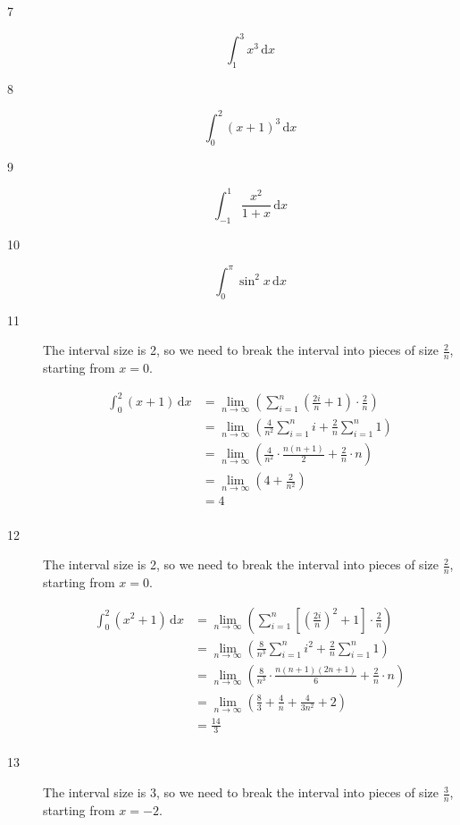 \documentclass{exam}
\begin{document}
\begin{description}
\item[7]
\[
  \int_1^3 x^3 \, \mathrm{d}x
\]

\item[8]
\[
  \int_0^2 (x+1)^3 \, \mathrm{d}x
\]

\item[9]
\[
  \int_{-1}^1 \frac{x^2}{1+x} \, \mathrm{d}x
\]

\item[10]
\[
  \int_0^\pi \sin^2 x \, \mathrm{d}x
\]

\item[11]
The interval size is 2, so we need to break the interval into pieces of size $\frac{2}{n}$, starting from $x = 0$.

\begin{align*}
  \int_0^2 (x+1) \, \mathrm{d}x &= \lim_{n \to \infty} \left( \sum_{i = 1}^n \left( \frac{2i}{n} + 1 \right) \cdot \frac{2}{n} \right) \\
  &= \lim_{n \to \infty} \left( \frac{4}{n^2} \sum_{i = 1}^n i + \frac{2}{n} \sum_{i = 1}^n 1 \right) \\
  &= \lim_{n \to \infty} \left( \frac{4}{n^2} \cdot \frac{n(n+1)}{2} + \frac{2}{n} \cdot n \right) \\
  &= \lim_{n \to \infty} \left( 4 + \frac{2}{n^2} \right) \\
  &= 4 \\
\end{align*}

\item[12]
The interval size is 2, so we need to break the interval into pieces of size $\frac{2}{n}$, starting from $x = 0$.

\begin{align*}
  \int_0^2 (x^2+1) \, \mathrm{d}x &= \lim_{n \to \infty} \left( \sum_{i = 1}^n \left[ \left( \frac{2i}{n} \right)^2+ 1 \right] \cdot \frac{2}{n} \right) \\
  &= \lim_{n \to \infty} \left( \frac{8}{n^3} \sum_{i = 1}^n i^2 + \frac{2}{n} \sum_{i = 1}^n 1 \right) \\
  &= \lim_{n \to \infty} \left( \frac{8}{n^3} \cdot \frac{n(n+1)(2n+1)}{6} + \frac{2}{n} \cdot n \right) \\
  &= \lim_{n \to \infty} \left( \frac{8}{3} + \frac{4}{n} + \frac{4}{3n^2} + 2 \right) \\
  &= \frac{14}{3} \\
\end{align*}

\item[13]
The interval size is 3, so we need to break the interval into pieces of size $\frac{3}{n}$, starting from $x = -2$.


\end{description}
\end{document}
